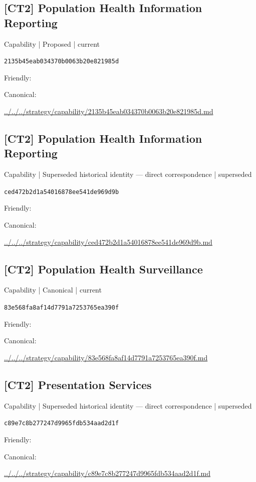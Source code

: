 \documentclass[10pt,a4paper]{article}
\begin{document}
\subsection*{[CT2] Population Health Information Reporting}
{\small Capability | Proposed | current}\par
\texttt{2135b45eab034370b0063b20e821985d}\par
Friendly: \par
Canonical: \par
{\footnotesize\url{../../../strategy/capability/2135b45eab034370b0063b20e821985d.md}}\par
\subsection*{[CT2] Population Health Information Reporting}
{\small Capability | Superseded historical identity — direct correspondence | superseded}\par
\texttt{ced472b2d1a54016878ee541de969d9b}\par
Friendly: \par
Canonical: \par
{\footnotesize\url{../../../strategy/capability/ced472b2d1a54016878ee541de969d9b.md}}\par
\subsection*{[CT2] Population Health Surveillance}
{\small Capability | Canonical | current}\par
\texttt{83e568fa8af14d7791a7253765ea390f}\par
Friendly: \par
Canonical: \par
{\footnotesize\url{../../../strategy/capability/83e568fa8af14d7791a7253765ea390f.md}}\par
\subsection*{[CT2] Presentation Services}
{\small Capability | Superseded historical identity — direct correspondence | superseded}\par
\texttt{c89e7c8b277247d9965fdb534aad2d1f}\par
Friendly: \par
Canonical: \par
{\footnotesize\url{../../../strategy/capability/c89e7c8b277247d9965fdb534aad2d1f.md}}\par
\end{document}
